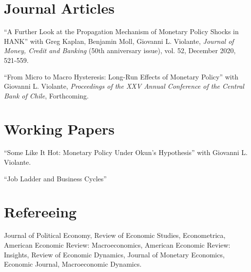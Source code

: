 \documentclass[11pt,letterpaper]{article}
\renewenvironment{itemize}{
  \begin{list}{}{
      \setlength{\leftmargin}{1.5em}
      \setlength{\itemsep}{0.25em}
      \setlength{\parskip}{0pt}
      \setlength{\parsep}{0.25em}
    }
}{
  \end{list}
}
\begin{document}
\section*{Journal Articles}
\begin{itemize}
    \item ``A Further Look at the Propagation Mechanism of Monetary Policy Shocks in HANK'' with Greg Kaplan, Benjamin Moll, Giovanni L. Violante, 
    \textit{Journal of Money, Credit and Banking} (50th anniversary issue), vol. 52, December 2020, 521-559.

    \item ``From Micro to Macro Hysteresis: Long-Run Effects of Monetary Policy'' with Giovanni L. Violante, 
    \textit{Proceedings of the XXV Annual Conference of the Central Bank of Chile}, Forthcoming.
\end{itemize}

\section*{Working Papers}
\begin{itemize}
  \item ``Some Like It Hot: Monetary Policy Under Okun's Hypothesis'' with Giovanni L. Violante.
  \item ``Job Ladder and Business Cycles''
\end{itemize}



\section*{Refereeing}
\begin{itemize}
    \item {Journal of Political Economy}, {Review of Economic Studies}, {Econometrica}, {American Economic Review: Macroeconomics}, {American Economic Review: Insights}, {Review of Economic Dynamics}, {Journal of Monetary Economics}, {Economic Journal}, {Macroeconomic Dynamics}.
\end{itemize}
\end{document}
